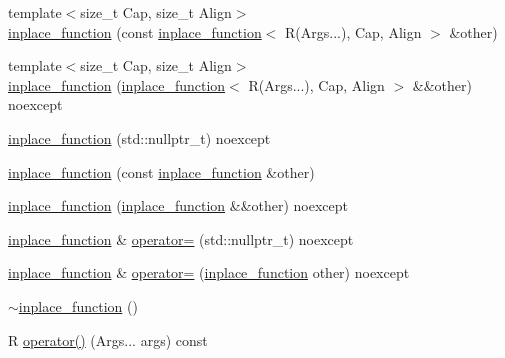 \begin{DoxyCompactItemize}
\item 
{\footnotesize template$<$size\+\_\+t Cap, size\+\_\+t Align$>$ }\\\hyperlink{classstdext_1_1inplace__function_3_01R_07Args_8_8_8_08_00_01Capacity_00_01Alignment_01_4_adc64caf861ce3703357c901c4691ace7}{inplace\+\_\+function} (const \hyperlink{classstdext_1_1inplace__function}{inplace\+\_\+function}$<$ R(Args...), Cap, Align $>$ \&other)
\item 
{\footnotesize template$<$size\+\_\+t Cap, size\+\_\+t Align$>$ }\\\hyperlink{classstdext_1_1inplace__function_3_01R_07Args_8_8_8_08_00_01Capacity_00_01Alignment_01_4_adeb6b2419556c7826ca7cd04c3b5ef2e}{inplace\+\_\+function} (\hyperlink{classstdext_1_1inplace__function}{inplace\+\_\+function}$<$ R(Args...), Cap, Align $>$ \&\&other) noexcept
\item 
\hyperlink{classstdext_1_1inplace__function_3_01R_07Args_8_8_8_08_00_01Capacity_00_01Alignment_01_4_a7bd44c3a16e8c7312be0cc3ae1e0d387}{inplace\+\_\+function} (std\+::nullptr\+\_\+t) noexcept
\item 
\hyperlink{classstdext_1_1inplace__function_3_01R_07Args_8_8_8_08_00_01Capacity_00_01Alignment_01_4_a1ccbc60554d934faf7c8e4188f6141b0}{inplace\+\_\+function} (const \hyperlink{classstdext_1_1inplace__function}{inplace\+\_\+function} \&other)
\item 
\hyperlink{classstdext_1_1inplace__function_3_01R_07Args_8_8_8_08_00_01Capacity_00_01Alignment_01_4_a9c97182aafdffc26da1f569830bf01bb}{inplace\+\_\+function} (\hyperlink{classstdext_1_1inplace__function}{inplace\+\_\+function} \&\&other) noexcept
\item 
\hyperlink{classstdext_1_1inplace__function}{inplace\+\_\+function} \& \hyperlink{classstdext_1_1inplace__function_3_01R_07Args_8_8_8_08_00_01Capacity_00_01Alignment_01_4_af53e5cf03650c43b743bd040674d4762}{operator=} (std\+::nullptr\+\_\+t) noexcept
\item 
\hyperlink{classstdext_1_1inplace__function}{inplace\+\_\+function} \& \hyperlink{classstdext_1_1inplace__function_3_01R_07Args_8_8_8_08_00_01Capacity_00_01Alignment_01_4_a191f41fe8250b4189176a9baae25ee60}{operator=} (\hyperlink{classstdext_1_1inplace__function}{inplace\+\_\+function} other) noexcept
\item 
\hyperlink{classstdext_1_1inplace__function_3_01R_07Args_8_8_8_08_00_01Capacity_00_01Alignment_01_4_acb623711bd68bbbf71cb7e233f6226de}{$\sim$inplace\+\_\+function} ()
\item 
R \hyperlink{classstdext_1_1inplace__function_3_01R_07Args_8_8_8_08_00_01Capacity_00_01Alignment_01_4_a64e0f59000063faaf35ebdcdf1e10bae}{operator()} (Args... args) const

\end{DoxyCompactItemize}
